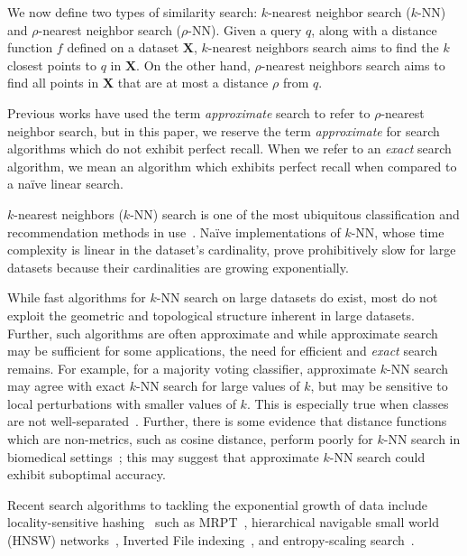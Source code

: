 We now define two types of similarity search: $k$-nearest neighbor search ($k$-NN) and $\rho$-nearest neighbor search ($\rho$-NN). 
Given a query $q$, along with a distance function $f$ defined on a dataset $\textbf{X}$, $k$-nearest neighbors search 
aims to find the $k$ closest points to $q$ in $ \textbf{X}$.
On the other hand, $\rho$-nearest neighbors search aims to find all points in $\textbf{X}$ that are at most a distance $\rho$ from $q$.

Previous works have used the term \emph{approximate} search to refer to $\rho$-nearest neighbor search, but in this paper, 
we reserve the term \emph{approximate} for search algorithms which do not exhibit perfect recall.
When we refer to an \emph{exact} search algorithm, we mean an algorithm which exhibits perfect recall when compared to a na\"{i}ve linear search.

$k$-nearest neighbors ($k$-NN) search is one of the most ubiquitous classification and recommendation methods in use~\cite{fix1952discriminatory, cover1967nearest}. 
Na\"{i}ve implementations of $k$-NN, whose time complexity is linear in the dataset's cardinality, prove prohibitively slow for large datasets because their cardinalities are growing exponentially.

While fast algorithms for $k$-NN search on large datasets do exist, most do not exploit the geometric and topological structure inherent in large datasets.
Further, such algorithms are often approximate and while approximate search may be sufficient for some applications, the need for efficient and \emph{exact} search remains.
For example, for a majority voting classifier, approximate $k$-NN search may agree with exact $k$-NN search for large values of $k$, but may be sensitive to local perturbations with smaller values of $k$.
This is especially true when classes are not well-separated~\cite{zhang2022imbalanced}.
Further, there is some evidence that distance functions which are non-metrics, such as cosine distance, perform poorly for $k$-NN search in biomedical settings~\cite{hu2016distance};
this may suggest that approximate $k$-NN search could exhibit suboptimal accuracy.

Recent search algorithms to tackling the exponential growth of data include locality-sensitive hashing~\cite{indyk1999sublinear} such as MRPT~\cite{hyvonen2016fast}, hierarchical navigable small world (HNSW) networks~\cite{Malkov2016EfficientAR}, Inverted File indexing~\cite{johnson2019billion}, and entropy-scaling search~\cite{yu2015entropy, ishaq2019clustered}.

